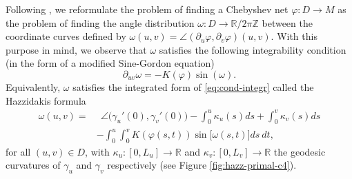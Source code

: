 \documentclass{article}
\newcommand{\DUV}{\partial_{uv}}
\newcommand{\R}{\mathbb{R}}
\newcommand{\Z}{\mathbb{Z}}
\newcommand{\surf}{M}
\newcommand{\ko}{\kappa}
\newcommand{\DU}{\partial_{u}}
\newcommand{\DV}{\partial_{v}}
\theoremstyle{remark}
\theoremstyle{prpart}
\begin{document}
Following \cite{Ghys09}, we reformulate the problem of finding a Chebyshev net $\varphi:D\to\surf$ as the problem of finding the angle distribution $\omega:D\to\R/2\pi\Z$ between the coordinate curves defined by $\omega(u,v) = \angle(\DU\varphi, \DV\varphi)(u,v)$. With this purpose in mind, we observe that $\omega$ satisfies the following integrability condition (in the form of a modified Sine-Gordon equation) \cite{Ghys09}
\begin{equation}  \label{eq:cond-integr}
  \DUV \omega = -K(\varphi) \sin(\omega).
\end{equation}
Equivalently, $\omega$ satisfies the integrated form of \eqref{eq:cond-integr} called the Hazzidakis formula
\begin{equation}  \label{eq:hazz-form}
\begin{split}
 \omega(u,v) =& ~~\angle\big(\gamma_u'(0),\gamma_v'(0)\big) - \int_0^u \ko_u(s)ds +
  \int_{0}^v\ko_v(s)ds\\
& - \int_0^u\int_0^vK(\varphi(s,t))\sin\big[\omega(s,t)\big]ds~dt,
\end{split}
\end{equation} 
for all $(u,v)\in D$, with $\ko_u:[0,L_u]\to\R$ and $\ko_v:[0,L_v]\to\R$ the geodesic curvatures of $\gamma_u$ and $\gamma_v$ respectively (see Figure \ref{fig:hazz-primal-c4}). 
\end{document}
